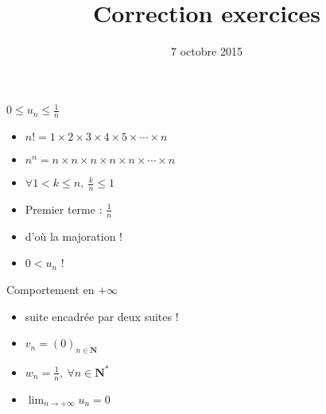 \documentclass[12pt,french]{beamer}
\title{Correction exercices}
\date{7 octobre 2015}
\newcommand{\N}{\mathbf{N}}
\begin{document}
\begin{frame}
  \maketitle
\end{frame}

\begin{frame}
  \begin{block}{$0\leq u_n \leqslant \frac1n$}
    \begin{itemize}
      \item $n! = 1\times2\times3\times4\times5\times\cdots\times n$
      \item $n^n = n\times n\times n\times n\times n\times\cdots\times n$
      \item $\forall 1 < k\leqslant n,\ \frac{k}{n} \leqslant 1$
      \item Premier terme : $\frac1n$
      \item d'où la majoration !
      \item $0<u_n$ !
    \end{itemize}
  \end{block}
  \begin{block}{Comportement en $+\infty$}
    \begin{itemize}
      \item suite encadrée par deux suites !
      \item $v_n = (0)_{n\in\N}$
      \item $w_n = \frac1n,\ \forall n \in\N^*$
      \item $\lim_{n\to+\infty}u_n = 0$
    \end{itemize}
  \end{block}
\end{frame}
\end{document}
